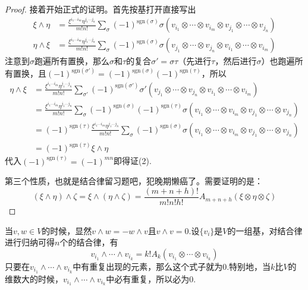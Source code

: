 \documentclass[11pt,a4paper,openany]{book}%
\theoremstyle{plain}%
\begin{document}
\begin{proof}
接着开始正式的证明。首先按基打开直接写出
\begin{equation*}
\begin{split}
\xi \wedge \eta&=\frac{\xi^{i_1\cdots i_m}\eta^{j_1 \cdots j_n}}{m!n!}\sum_{\sigma}(-1)^{\mathrm{sgn}(\sigma)}\sigma(v_{i_1}\otimes \cdots \otimes v_{i_m}\otimes v_{j_1}\otimes \cdots \otimes v_{j_n})\\
\eta \wedge \xi&=\frac{\xi^{i_1\cdots i_m}\eta^{j_1 \cdots j_n}}{m!n!}\sum_{\sigma}(-1)^{\mathrm{sgn}(\sigma)}\sigma(v_{j_1}\otimes \cdots \otimes v_{j_n}\otimes v_{i_1}\otimes \cdots \otimes v_{i_m})
\end{split}
\end{equation*}
注意到$\sigma$跑遍所有置换，那么$\sigma$和$\tau$的复合$\sigma'=\sigma\tau$（先进行$\tau$，然后进行$\sigma$）也跑遍所有置换，且$(-1)^{\mathrm{sgn}(\sigma')}=(-1)^{\mathrm{sgn}(\sigma)}(-1)^{\mathrm{sgn}(\tau)}$，所以
\begin{equation*}
\begin{split}
\eta \wedge \xi&=\frac{\xi^{i_1\cdots i_m}\eta^{j_1 \cdots j_n}}{m!n!}\sum_{\sigma'}(-1)^{\mathrm{sgn}(\sigma')}\sigma'(v_{j_1}\otimes \cdots \otimes v_{j_n}\otimes v_{i_1}\otimes \cdots \otimes v_{i_m})\\
&=\frac{\xi^{i_1\cdots i_m}\eta^{j_1 \cdots j_n}}{m!n!}\sum_{\sigma}(-1)^{\mathrm{sgn}(\sigma)}(-1)^{\mathrm{sgn}(\tau)}\sigma(v_{i_1}\otimes \cdots \otimes v_{i_m}\otimes v_{j_1}\otimes \cdots \otimes v_{j_n})\\
&=(-1)^{\mathrm{sgn}(\tau)}\frac{\xi^{i_1\cdots i_m}\eta^{j_1 \cdots j_n}}{m!n!}\sum_{\sigma}(-1)^{\mathrm{sgn}(\sigma)}\sigma(v_{i_1}\otimes \cdots \otimes v_{i_m}\otimes v_{j_1}\otimes \cdots \otimes v_{j_n})\\
&=(-1)^{\mathrm{sgn}(\tau)} \xi \wedge \eta
\end{split}
\end{equation*}
代入$(-1)^{\mathrm{sgn}(\tau)}=(-1)^{mn}$即得证(2).

第三个性质，也就是结合律留习题吧，犯晚期懒癌了。需要证明的是：
\[
(\xi \wedge \eta) \wedge \zeta=\xi \wedge (\eta \wedge \zeta)=\frac{(m+n+h)!}{m!n!h!}A_{m+n+h}(\xi \otimes \eta \otimes \zeta)
\]
\end{proof}

\indent 当$v,w\in V$的时候，显然$v \wedge w=-w \wedge v$且$v \wedge v=0$.设$\{v_i\}$是$V$的一组基，对结合律进行归纳可得$n$个的结合律，有
\[
v_{i_1} \wedge \cdots \wedge v_{i_k}=k!A_k(v_{i_1} \otimes \cdots \otimes v_{i_k})
\]
只要在$v_{i_1} \wedge \cdots \wedge v_{i_k}$中有重复出现的元素，那么这个式子就为0.特别地，当$k$比$V$的维数大的时候，$v_{i_1} \wedge \cdots \wedge v_{i_k}$中必有重复，所以必为0.
\end{document}
